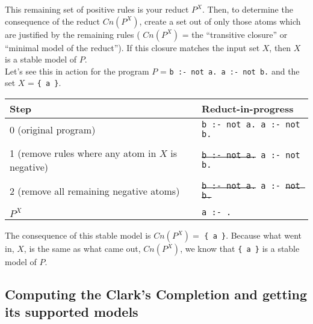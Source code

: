 \documentclass[9pt,a4paper,landscape]{article}
\begin{document}
{\noindent This remaining set of positive rules is your reduct $P^X$.
Then, to determine the consequence of the reduct $Cn(P^X)$, create a set out of only those atoms which are justified by the remaining rules ( $Cn(P^X)$ = the ``transitive closure'' or ``minimal model of the reduct'').
If this closure matches the input set $X$, then $X$ is a stable model of $P$.\\

\noindent Let's see this in action for the program $P$ = \texttt{b :- not a. a :- not b.} and the set $X$ = \texttt{\{ a \}}.

\begin{center}
	\begin{tabular}{p{5cm}p{5cm}}
		Step & Reduct-in-progress \\ \midrule
		
		0 (original program)	& \texttt{b :- not a. \newline a :- not b.} \\&\\
		
		1 (remove rules where any atom in $X$ is negative) & \texttt{\sout{b :- not a.} \newline a :- not b.} \\&\\
		
		2 (remove all remaining negative atoms)	& \texttt{\sout{b :- not a.} \newline a :- \sout{not b.}} \\&\\
		
		$P^X$ & \texttt{a :- .}
	\end{tabular}
\end{center}

\noindent The consequence of this stable model is $Cn(P^X) =$ \texttt{\{ a \}}.
Because what went in, $X$, is the same as what came out, $Cn(P^X)$, we know that \texttt{\{ a \}} is a stable model of $P$.


\pagebreak


\subsection{Computing the Clark's Completion and getting its supported models}
\label{subsec:compl-supp}

}
\end{document}
